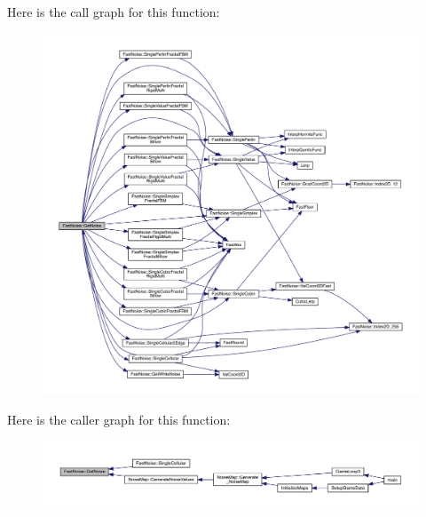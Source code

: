 Here is the call graph for this function\+:
\nopagebreak
\begin{figure}[H]
\begin{center}
\leavevmode
\includegraphics[width=350pt]{class_fast_noise_a61722acaa5692a40ee939d578b6a40d1_cgraph}
\end{center}
\end{figure}
Here is the caller graph for this function\+:
\nopagebreak
\begin{figure}[H]
\begin{center}
\leavevmode
\includegraphics[width=350pt]{class_fast_noise_a61722acaa5692a40ee939d578b6a40d1_icgraph}
\end{center}
\end{figure}
\mbox{\label{class_fast_noise_a0d9b7a6858a599cde4dc5b8f74264ae0}} 
